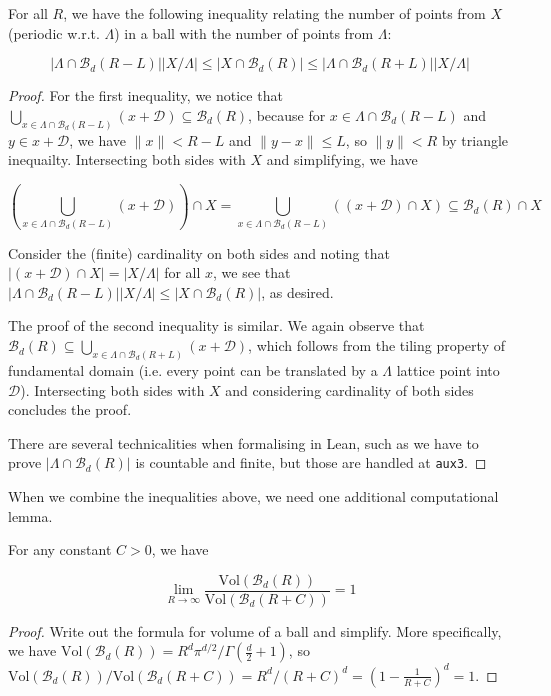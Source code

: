 \begin{theorem}\label{lemma:periodic-points-bounds}\leanok
  For all $R$, we have the following inequality relating the number of points from $X$ (periodic w.r.t. $\Lambda$) in a ball with the number of points from $\Lambda$:

  \[
    \left|\Lambda \cap \mathcal{B}_d(R - L)\right|\left|X / \Lambda\right|
    \leq \left|X \cap \mathcal{B}_d(R)\right|
    \leq \left|\Lambda \cap \mathcal{B}_d(R + L)\right|\left|X / \Lambda\right|
  \]
\end{theorem}
\begin{proof}
  For the first inequality, we notice that $\bigcup_{x \in \Lambda \cap \mathcal{B}_d(R - L)} (x + \mathcal{D}) \subseteq \mathcal{B}_d(R)$, because for $x \in \Lambda \cap \mathcal{B}_d(R - L)$ and $y \in x + \mathcal{D}$, we have $\|x\| < R - L$ and $\|y - x\| \leq L$, so $\|y\| < R$ by triangle inequailty. Intersecting both sides with $X$ and simplifying, we have

  \[
    \left(\bigcup_{x \in \Lambda \cap \mathcal{B}_d(R - L)} (x + \mathcal{D})\right) \cap X = \bigcup_{x \in \Lambda \cap \mathcal{B}_d(R - L)} ((x + \mathcal{D}) \cap X) \subseteq \mathcal{B}_d(R) \cap X
  \]

  Consider the (finite) cardinality on both sides and noting that $|(x + \mathcal{D}) \cap X| = |X / \Lambda|$ for all $x$, we see that $|\Lambda \cap \mathcal{B}_d(R - L)||X / \Lambda| \leq |X \cap \mathcal{B}_d(R)|$, as desired.

  The proof of the second inequality is similar. We again observe that $\mathcal{B}_d(R) \subseteq \bigcup_{x \in \Lambda \cap \mathcal{B}_d(R + L)} (x + \mathcal{D})$, which follows from the tiling property of fundamental domain (i.e. every point can be translated by a $\Lambda$ lattice point into $\mathcal{D}$). Intersecting both sides with $X$ and considering cardinality of both sides concludes the proof.

  There are several technicalities when formalising in Lean, such as we have to prove $|\Lambda \cap \mathcal{B}_d(R)|$ is countable and finite, but those are handled at \texttt{aux3}.
\end{proof}

When we combine the inequalities above, we need one additional computational lemma.

\begin{lemma}\label{lemma:volume-ball-ratio-limit}\leanok
  For any constant $C > 0$, we have

  \[
    \lim_{R \to \infty} \frac{\mathrm{Vol}(\mathcal{B}_d(R))}{\mathrm{Vol}(\mathcal{B}_d(R + C))} = 1
  \]
\end{lemma}
\begin{proof}
  Write out the formula for volume of a ball and simplify. More specifically, we have $\mathrm{Vol}(\mathcal{B}_d(R)) = R^d \pi^{d / 2} / \Gamma\left(\frac{d}{2} + 1\right)$, so $\mathrm{Vol}(\mathcal{B}_d(R)) / \mathrm{Vol}(\mathcal{B}_d(R + C)) = R^d / (R + C)^d = \left(1 - \frac{1}{R + C}\right)^d = 1$.
\end{proof}

